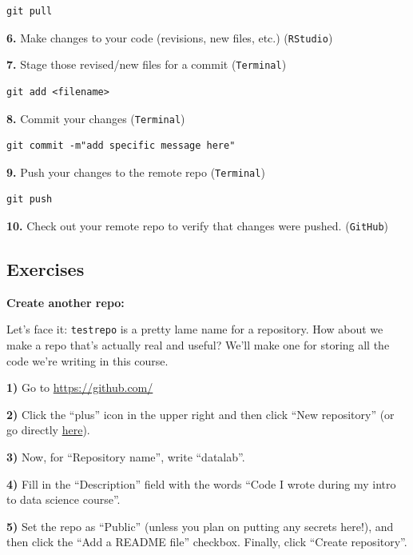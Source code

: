 \documentclass[
]{book}
\begin{document}
\begin{verbatim}
git pull
\end{verbatim}

\textbf{6.} Make changes to your code (revisions, new files, etc.) (\texttt{RStudio})

\textbf{7.} Stage those revised/new files for a commit (\texttt{Terminal})

\begin{verbatim}
git add <filename>
\end{verbatim}

\textbf{8.} Commit your changes (\texttt{Terminal})

\begin{verbatim}
git commit -m"add specific message here"
\end{verbatim}

\textbf{9.} Push your changes to the remote repo (\texttt{Terminal})

\begin{verbatim}
git push
\end{verbatim}

\textbf{10.} Check out your remote repo to verify that changes were pushed. (\texttt{GitHub})

\hypertarget{exercises-12}{%
\subsection*{Exercises}\label{exercises-12}}

\textbf{Create another repo:}

Let's face it: \texttt{testrepo} is a pretty lame name for a repository. How about we make a repo that's actually real and useful? We'll make one for storing all the code we're writing in this course.

\textbf{1)} Go to \url{https://github.com/}

\textbf{2)} Click the ``plus'' icon in the upper right and then click ``New repository'' (or go directly \href{https://github.com/new}{here}).

\textbf{3)} Now, for ``Repository name'', write ``datalab''.

\textbf{4)} Fill in the ``Description'' field with the words ``Code I wrote during my intro to data science course''.

\textbf{5)} Set the repo as ``Public'' (unless you plan on putting any secrets here!), and then click the ``Add a README file'' checkbox. Finally, click ``Create repository''.
\end{document}
